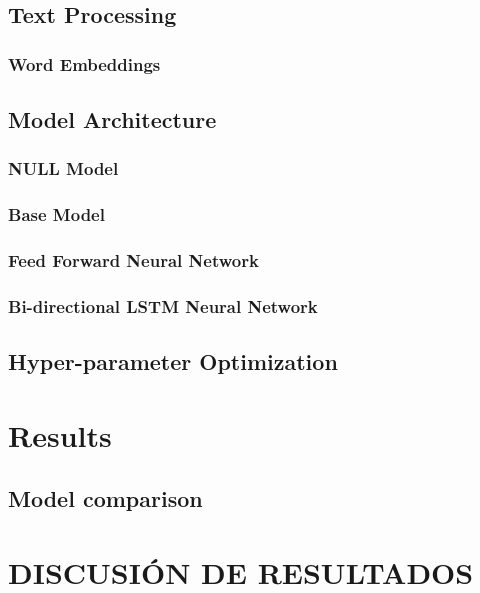 \documentclass[12pt,a4paper,oneside]{report}
\begin{document}
\section{Text Processing}
\subsection{Word Embeddings}

\section{Model Architecture}
\subsection{NULL Model}
\subsection{Base Model}
\subsection{Feed Forward Neural Network}
\subsection{Bi-directional LSTM Neural Network}

\section{Hyper-parameter Optimization}


\chapter{Results}
\section{Model comparison}


\chapter{DISCUSIÓN DE RESULTADOS}
\end{document}
